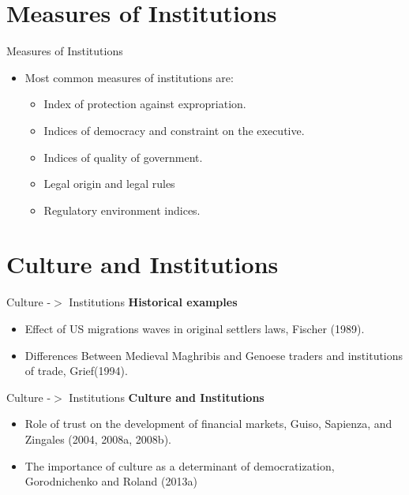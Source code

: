 \documentclass{beamer}
\begin{document}
\section{Measures of Institutions}
                        \begin{frame}{Measures of Institutions}
\begin{itemize}
    \item Most common measures of institutions are:
             \vspace{0.3cm}
        \pause 
        \begin{itemize}
            \item Index of protection against expropriation.
            \pause
            \item Indices of democracy and constraint on the executive.
            \pause
            \item Indices of quality of government.
            \pause
            \item Legal origin and legal rules
            \pause
            \item Regulatory environment indices.
        \end{itemize}
\end{itemize}
    \end{frame}

    \section{Culture and Institutions}
\begin{frame}{Culture -$>$ Institutions}
\textbf{Historical examples}
\begin{itemize}
    \item Effect of US migrations waves in original settlers laws, Fischer (1989).
    \pause 
    \item Differences Between Medieval Maghribis and Genoese traders and institutions of trade, Grief(1994).

\end{itemize}
    
\end{frame}

\begin{frame}{Culture -$>$ Institutions}
\textbf{Culture and Institutions}
\begin{itemize}
    \item Role of trust on the development of financial markets, Guiso, Sapienza, and Zingales (2004, 2008a, 2008b).
    \pause 
    \item  The importance of culture as a determinant of democratization, Gorodnichenko and Roland (2013a)

\end{itemize}
    
\end{frame}
\end{document}
